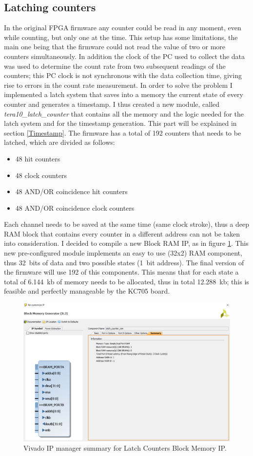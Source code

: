 \subsection{Latching counters}\label{Latch}
\noindent In the original FPGA firmware any counter could be read in any moment, even while counting, but only one at the time.
This setup has some limitations, the main one being that the firmware could not read the value of two or more counters simultaneously.
In addition the clock of the PC used to collect the data was used to determine the count rate from two subsequent readings of the counters; this PC clock is not synchronous with the data collection time, giving rise to errors in the count rate measurement.
In order to solve the problem I implemented a latch system that saves into a memory the current state of every counter and generates a timestamp.
I thus created a new module, called \textit{tera10\_latch\_counter} that contains all the memory and the logic needed for the latch system and for the timestamp generation.
This part will be explained in section \ref{Timestamp}.
The firmware has a total of 192 counters that needs to be latched, which are divided as follows:
\begin{itemize}
	\item 48 hit counters
	\item 48 clock counters
	\item 48 AND/OR coincidence hit counters
	\item 48 AND/OR coincidence clock counters
\end{itemize}
\noindent Each channel needs to be saved at the same time (same clock stroke), thus a deep RAM block that contains every counter in a different address can not be taken into consideration.
I decided to compile a new Block RAM IP, as in figure \ref{fig:ramip}. This new pre-configured module implements an easy to use (32x2) RAM component, thus 32~bits of data and two possible states (1~bit address). The final version of the firmware will use 192 of this components.
This means that for each state a total of 6.144~kb of memory needs to be allocated, thus in total 12.288~kb; this is feasible and perfectly manageable by the KC705 board. 
\begin{figure}[H]
	\centering
	\includegraphics[width=0.5\linewidth]{IMG/ch4/LATCH_RAM_IP}
	\caption{Vivado IP manager summary for Latch Counters Block Memory IP.}
	\label{fig:ramip}
\end{figure}
